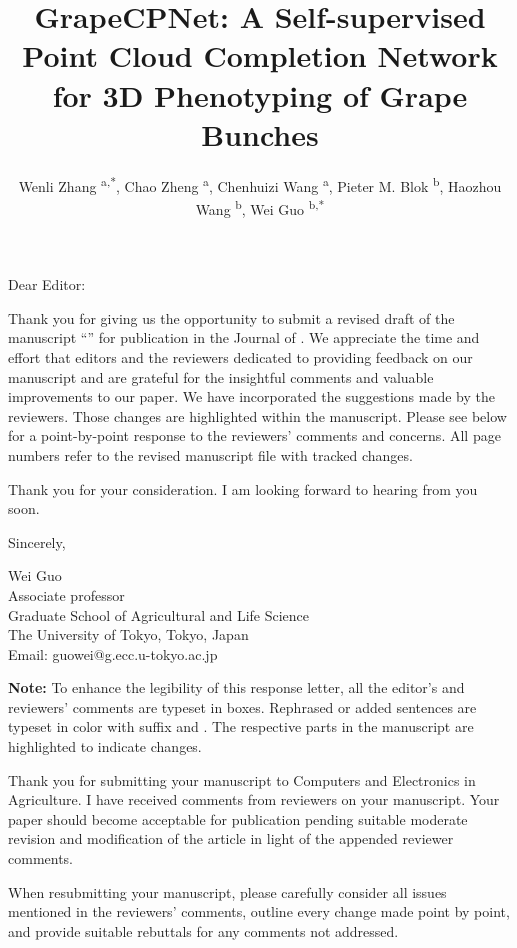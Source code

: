 \documentclass{ar2rc}
\title{GrapeCPNet: A Self-supervised Point Cloud Completion Network for 3D Phenotyping of Grape Bunches}
\author{
    Wenli Zhang \textsuperscript{a,*},
    Chao Zheng \textsuperscript{a},
    Chenhuizi Wang \textsuperscript{a},
    Pieter M. Blok \textsuperscript{b},
    Haozhou Wang \textsuperscript{b},
    Wei Guo \textsuperscript{b,*}
}
\begin{document}
\begin{center}
    \maketitle
\end{center}

\thedate

Dear Editor:

Thank you for giving us the opportunity to submit a revised draft of the manuscript ``\thetitle'' for publication in the Journal of \thejournal. We appreciate the time and effort that editors and the reviewers dedicated to providing feedback on our manuscript and are grateful for the insightful comments and valuable improvements to our paper. We have incorporated the suggestions made by the reviewers. Those changes are highlighted within the manuscript. Please see below for a point-by-point response to the reviewers' comments and concerns. All page numbers refer to the revised manuscript file with tracked changes.

Thank you for your consideration. I am looking forward to hearing from you soon.

Sincerely,

Wei Guo\\
Associate professor\\
Graduate School of Agricultural and Life Science\\
The University of Tokyo, Tokyo, Japan\\
Email: guowei@g.ecc.u-tokyo.ac.jp

\vfill
\textbf{Note:} To enhance the legibility of this response letter, all the editor's and reviewers' comments are typeset in boxes. Rephrased or added sentences are typeset in color with suffix \added[id=R1]{} and \added[id=R2]{}. The respective parts in the manuscript are highlighted to indicate changes.

\editor

\begin{reviewercomment}
    Thank you for submitting your manuscript to Computers and Electronics in Agriculture. 
    I have received comments from reviewers on your manuscript. 
    Your paper should become acceptable for publication pending suitable moderate revision and modification of the article in light of the appended reviewer comments.

    When resubmitting your manuscript, please carefully consider all issues mentioned in the reviewers' comments, outline every change made point by point, and provide suitable rebuttals for any comments not addressed.
\end{reviewercomment}
\end{document}
